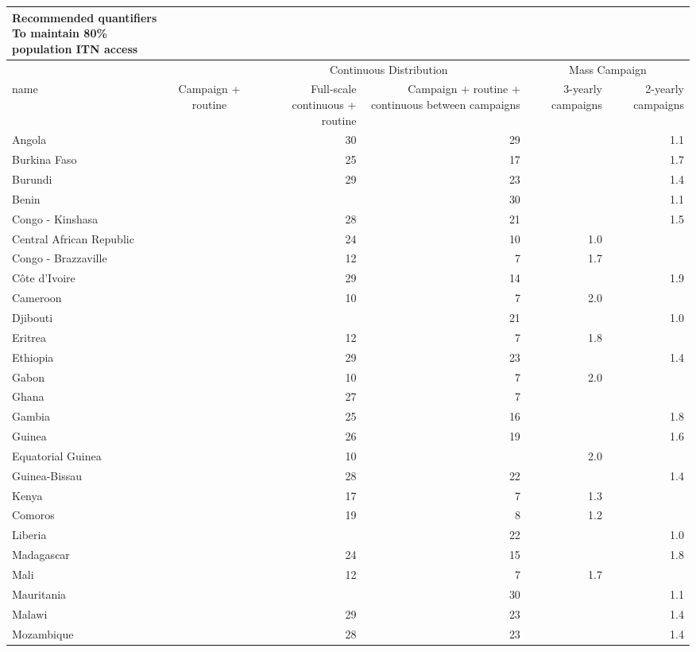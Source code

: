\documentclass[review,
3p]{elsarticle} %
\begin{document}
\captionsetup[table]{labelformat=empty,skip=1pt}
\begin{longtable}{lcrrrr}
\caption*{
{\large Recommended quantifiers} \\ 
{\small To maintain 80\% population ITN access}
} \\ 
\toprule
 &  & \multicolumn{2}{c}{Continuous Distribution} & \multicolumn{2}{c}{Mass Campaign} \\ 
\cmidrule(lr){3-4} \cmidrule(lr){5-6}
name & Campaign + routine & Full-scale continuous + routine & Campaign + routine + continuous between campaigns & 3-yearly campaigns & 2-yearly campaigns \\ 
\midrule
Angola &  & 30 & 29 &  & 1.1 \\ 
Burkina Faso &  & 25 & 17 &  & 1.7 \\ 
Burundi &  & 29 & 23 &  & 1.4 \\ 
Benin &  &  & 30 &  & 1.1 \\ 
Congo - Kinshasa &  & 28 & 21 &  & 1.5 \\ 
Central African Republic &  & 24 & 10 & 1.0 &  \\ 
Congo - Brazzaville &  & 12 & 7 & 1.7 &  \\ 
Côte d’Ivoire &  & 29 & 14 &  & 1.9 \\ 
Cameroon &  & 10 & 7 & 2.0 &  \\ 
Djibouti &  &  & 21 &  & 1.0 \\ 
Eritrea &  & 12 & 7 & 1.8 &  \\ 
Ethiopia &  & 29 & 23 &  & 1.4 \\ 
Gabon &  & 10 & 7 & 2.0 &  \\ 
Ghana &  & 27 & 7 &  &  \\ 
Gambia &  & 25 & 16 &  & 1.8 \\ 
Guinea &  & 26 & 19 &  & 1.6 \\ 
Equatorial Guinea &  & 10 &  & 2.0 &  \\ 
Guinea-Bissau &  & 28 & 22 &  & 1.4 \\ 
Kenya &  & 17 & 7 & 1.3 &  \\ 
Comoros &  & 19 & 8 & 1.2 &  \\ 
Liberia &  &  & 22 &  & 1.0 \\ 
Madagascar &  & 24 & 15 &  & 1.8 \\ 
Mali &  & 12 & 7 & 1.7 &  \\ 
Mauritania &  &  & 30 &  & 1.1 \\ 
Malawi &  & 29 & 23 &  & 1.4 \\ 
Mozambique &  & 28 & 23 &  & 1.4 \\ 

\end{longtable}
\end{document}
